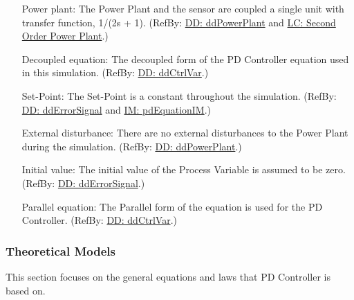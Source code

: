 \documentclass[12pt]{article}
\begin{document}
\begin{itemize}
\item[Power plant:\phantomsection\label{pwrPlant}]{The Power Plant and the sensor are coupled  a single unit with transfer function, 1/(2s + 1). (RefBy: \hyperref[DD:ddPowerPlant]{DD: ddPowerPlant} and \hyperref[likeChgIC]{LC: Second Order Power Plant}.)}
\item[Decoupled equation:\phantomsection\label{decoupled}]{The decoupled form of the PD Controller equation used in this simulation. (RefBy: \hyperref[DD:ddCtrlVar]{DD: ddCtrlVar}.)}
\item[Set-Point:\phantomsection\label{setPoint}]{The Set-Point is a constant throughout the simulation. (RefBy: \hyperref[DD:ddErrorSignal]{DD: ddErrorSignal} and \hyperref[IM:pdEquationIM]{IM: pdEquationIM}.)}
\item[External disturbance:\phantomsection\label{externalDistub}]{There are no external disturbances to the Power Plant during the simulation. (RefBy: \hyperref[DD:ddPowerPlant]{DD: ddPowerPlant}.)}
\item[Initial value:\phantomsection\label{initialValue}]{The initial value of the Process Variable is assumed to be zero. (RefBy: \hyperref[DD:ddErrorSignal]{DD: ddErrorSignal}.)}
\item[Parallel equation:\phantomsection\label{parallelEq}]{The Parallel form of the equation is used for the PD Controller. (RefBy: \hyperref[DD:ddCtrlVar]{DD: ddCtrlVar}.)}
\end{itemize}
\subsubsection{Theoretical Models}
\label{Sec:TMs}
This section focuses on the general equations and laws that PD Controller is based on.
\end{document}
